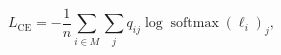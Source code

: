 \begin{equation}
L_{\mathrm{CE}}=-\frac1n\sum_{i\in M}\sum_j q_{ij}\log\operatorname{softmax}(\ell_i)_j,\tag{13}\label{eq:original-13}
\end{equation}
